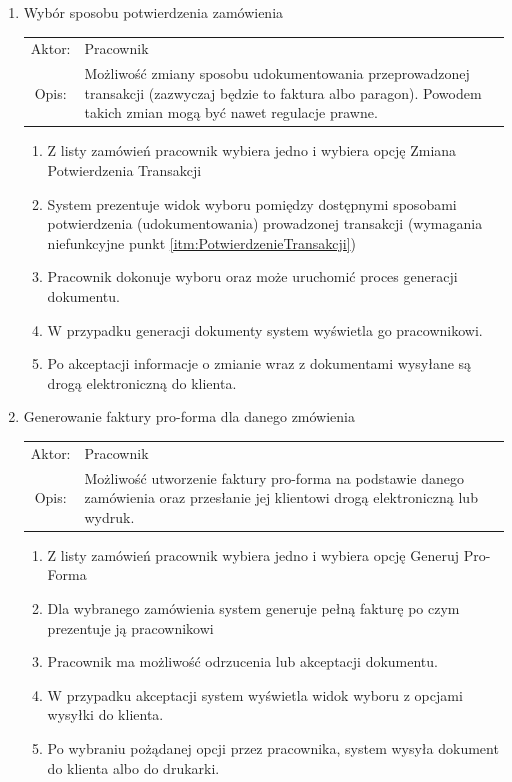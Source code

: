 \begin{enumerate}
  \item Wybór sposobu potwierdzenia zamówienia\\
  \begin{tabularx}{\linewidth}{c X}
  Aktor: & Pracownik \\
  Opis: & Możliwość zmiany sposobu udokumentowania przeprowadzonej transakcji
  (zazwyczaj będzie to faktura albo paragon). Powodem takich zmian mogą być
  nawet regulacje prawne.
  \end{tabularx}	
	\begin{enumerate}
	  \item Z listy zamówień pracownik wybiera jedno i wybiera opcję Zmiana
	  Potwierdzenia Transakcji
	  \item System prezentuje widok wyboru pomiędzy dostępnymi sposobami
	  potwierdzenia (udokumentowania) prowadzonej transakcji (wymagania
	  niefunkcyjne punkt \ref{itm:PotwierdzenieTransakcji})
	  \item Pracownik dokonuje wyboru oraz może uruchomić proces generacji
	  dokumentu.
	  \item W przypadku generacji dokumenty system wyświetla go pracownikowi.
	  \item Po akceptacji informacje o zmianie wraz z dokumentami wysyłane są drogą
	  elektroniczną do klienta.
	\end{enumerate}

  \item Generowanie faktury pro-forma dla danego zmówienia\\
  \begin{tabularx}{\linewidth}{c X}
  Aktor: & Pracownik \\
  Opis: & Możliwość utworzenie faktury pro-forma na podstawie danego zamówienia
  oraz przesłanie jej klientowi drogą elektroniczną lub wydruk.
  \end{tabularx}
	\begin{enumerate}
	  \item Z listy zamówień pracownik wybiera jedno i wybiera opcję Generuj
	  Pro-Forma
	  \item Dla wybranego zamówienia system generuje pełną fakturę po czym
	  prezentuje ją pracownikowi
	  \item Pracownik ma możliwość odrzucenia lub akceptacji dokumentu.
	  \item W przypadku akceptacji system wyświetla widok wyboru z opcjami wysyłki
	  do klienta.
	  \item Po wybraniu pożądanej opcji przez pracownika, system wysyła dokument do
	  klienta albo do drukarki.
	\end{enumerate}


\end{enumerate}
